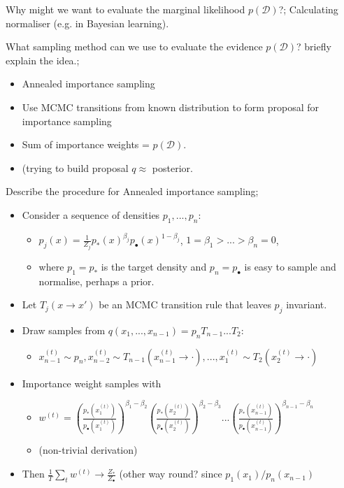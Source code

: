 \documentclass{article}
\begin{document}

Why might we want to evaluate the marginal likelihood $p(\mathcal{D})$?; Calculating normaliser (e.g. in Bayesian learning).

What sampling method can we use to evaluate the evidence $p(\mathcal{D})$? briefly explain the idea.; \begin{itemize} \item Annealed importance sampling \item Use MCMC transitions from known distribution to form proposal for importance sampling \item Sum of importance weights = $p(\mathcal{D})$. \item (trying to build proposal $q\approx$ posterior. \end{itemize}

Describe the procedure for Annealed importance sampling; \begin{itemize} \item Consider a sequence of densities $p_1, ..., p_n$: \begin{itemize} \item $p_j(x) = \frac{1}{Z_j}p_*(x)^{\beta_j}p_\bullet(x)^{1-\beta_j}$, $1=\beta_1 > ... > \beta_n = 0$, \item where $p_1 = p_*$ is the target density and $p_n = p_\bullet$ is easy to sample and normalise, perhaps a prior. \end{itemize} \item Let $T_j(x\rightarrow x')$ be an MCMC transition rule that leaves $p_j$ invariant. \item Draw samples from $q(x_1,...,x_{n-1}) = p_nT_{n-1}...T_2$: \begin{itemize} \item $x_{n-1}^{(t)}\sim p_n, x^{(t)}_{n-2} \sim T_{n-1}(x^{(t)}_{n-1}\rightarrow \cdot ), ..., x^{(t)}_1\sim T_2(x_2^{(t)}\rightarrow \cdot)$ \end{itemize} \item Importance weight samples with \begin{itemize} \item $w^{(t)} = (\frac{p_*(x_1^{(t)})}{p_\bullet(x_1^{(t)})})^{\beta_1-\beta_2}(\frac{p_*(x_2^{(t)})}{p_\bullet(x_2^{(t)})})^{\beta_2-\beta_3}...(\frac{p_*(x_{n-1}^{(t)})}{p_\bullet(x_{n-1}^{(t)})})^{\beta_{n-1}-\beta_n}$ \item (non-trivial derivation) \end{itemize} \item Then $\frac{1}{T}\sum_t w^{(t)} \rightarrow \frac{Z_*}{Z_\bullet}$  (other way round? since $p_1(x_1)/p_n(x_{n-1})$\end{itemize}
\end{document}
